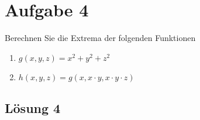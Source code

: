 \documentclass[main.tex]{subfiles}
\begin{document}
\section{Aufgabe 4}
Berechnen Sie die Extrema der folgenden Funktionen
\begin{enumerate}
    \item $g(x,y,z) = x^2 + y^2 + z^2$
    \item $h(x,y,z) = g(x, x\cdot y, x\cdot y\cdot z)$
\end{enumerate}

\subsection{Lösung 4}
\end{document}
